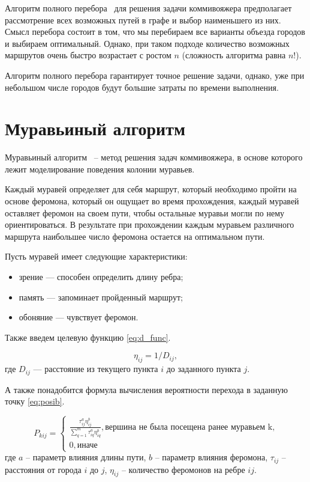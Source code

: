 Алгоритм полного перебора~\cite{bib2} для решения задачи коммивояжера предполагает рассмотрение всех возможных путей в графе и выбор наименьшего из них. Смысл перебора состоит в том, что мы перебираем все варианты объезда городов и выбираем оптимальный. Однако, при таком подходе количество возможных маршрутов очень быстро возрастает с ростом $n$ (сложность алгоритма равна $n!$).

Алгоритм полного перебора гарантирует точное решение задачи, однако, уже при небольшом числе городов будут большие затраты по времени выполнения.

\section{Муравьиный алгоритм}


Муравьиный алгоритм~\cite{bib3} -- метод решения задач коммивояжера, в основе которого лежит моделирование поведения колонии муравьев.

Каждый муравей определяет для себя маршрут, который необходимо пройти на основе феромона, который он ощущает во время прохождения, каждый муравей оставляет феромон на своем пути, чтобы остальные муравьи могли по нему ориентироваться. В результате при прохождении каждым муравьем различного маршрута наибольшее число феромона остается на оптимальном пути.


Пусть муравей имеет следующие характеристики:
\begin{itemize}[label=---]
	\item зрение --- способен определить длину ребра;
	\item память --- запоминает пройденный маршрут;
	\item обоняние --- чувствует феромон.
\end{itemize}


Также введем целевую функцию \ref{eq:d_func}.

\begin{equation}
	\label{eq:d_func}
	\eta_{ij} = 1 / D_{ij},
\end{equation}
где $D_{ij}$ — расстояние из текущего пункта $i$ до заданного пункта $j$.


А также понадобится формула вычисления вероятности перехода в заданную точку \ref{eq:posib}.

\begin{equation}
	\label{eq:posib}
	P_{kij} = \begin{cases}
		\frac{\tau_{ij}^a\eta_{ij}^b}{\sum_{q=1}^m \tau^a_{iq}\eta^b_{iq}}, \textrm{вершина не была посещена ранее муравьем k,} \\
		0, \textrm{иначе}
	\end{cases}
\end{equation}
где $a$ -- параметр влияния длины пути, $b$ -- параметр влияния феромона, $\tau_{ij}$ -- расстояния от города $i$ до $j$, $\eta_{ij}$ -- количество феромонов на ребре $ij$.

